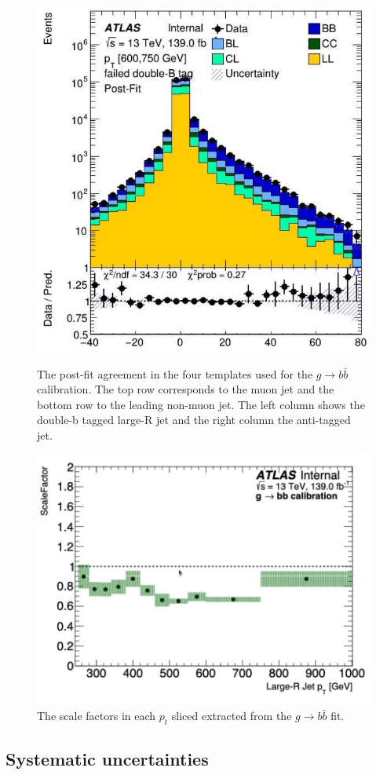 \documentclass[10pt,a4paper]{book}
\begin{document}
\begin{figure}
    \includegraphics[width=0.485\linewidth]{ftag/postfit_600-750_sd0/nonmuon_fail.png} \\
    \caption{The post-fit agreement in the four templates used for the $g\rightarrow b \bar{b}$ calibration. The top row corresponds to the muon jet and the bottom row to the leading non-muon jet. The left column shows the double-b tagged large-R jet and the right column the anti-tagged jet.}
    \label{fig:postfit}
\end{figure}

\begin{figure}
    \centering
    \includegraphics[width=0.9\linewidth]{ftag/sf_sd0.png}
    \caption{The scale factors in each $p_t$ sliced extracted from the $g\rightarrow b\bar{b}$ fit.}
    \label{fig:sf_sd0}
\end{figure}

\subsection{Systematic uncertainties}
\end{document}

